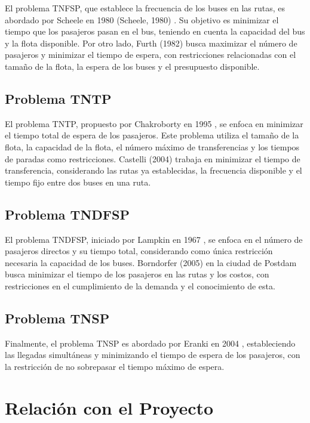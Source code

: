 \documentclass[preprint,11pt]{elsarticle}
\begin{document}
El problema TNFSP, que establece la frecuencia de los buses en las rutas, es abordado por Scheele en 1980 (Scheele, 1980) \cite{scheele1980}. Su objetivo es minimizar el tiempo que los pasajeros pasan en el bus, teniendo en cuenta la capacidad del bus y la flota disponible. Por otro lado, Furth (1982) \cite{furth1982} busca maximizar el número de pasajeros y minimizar el tiempo de espera, con restricciones relacionadas con el tamaño de la flota, la espera de los buses y el presupuesto disponible.

\subsection{Problema TNTP}

El problema TNTP, propuesto por Chakroborty en 1995 \cite{chakroborty1995}, se enfoca en minimizar el tiempo total de espera de los pasajeros. Este problema utiliza el tamaño de la flota, la capacidad de la flota, el número máximo de transferencias y los tiempos de paradas como restricciones. Castelli (2004) \cite{castelli2004} trabaja en minimizar el tiempo de transferencia, considerando las rutas ya establecidas, la frecuencia disponible y el tiempo fijo entre dos buses en una ruta.

\subsection{Problema TNDFSP}

El problema TNDFSP, iniciado por Lampkin en 1967 \cite{lampkin1967}, se enfoca en el número de pasajeros directos y su tiempo total, considerando como única restricción necesaria la capacidad de los buses. Borndorfer (2005) \cite{borndorfer2005} en la ciudad de Postdam busca minimizar el tiempo de los pasajeros en las rutas y los costos, con restricciones en el cumplimiento de la demanda y el conocimiento de esta.

\subsection{Problema TNSP}

Finalmente, el problema TNSP es abordado por Eranki en 2004 \cite{eranki2004}, estableciendo las llegadas simultáneas y minimizando el tiempo de espera de los pasajeros, con la restricción de no sobrepasar el tiempo máximo de espera.

\section{Relación con el Proyecto}
\end{document}
